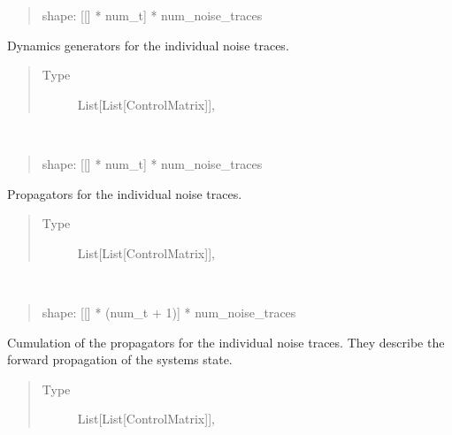 \documentclass[letterpaper,10pt,english]{sphinxmanual}
\begin{document}
\begin{fulllineitems}
\begin{fulllineitems}
\begin{quote}
shape: {[}{[}{]} * num\_t{]} * num\_noise\_traces
\end{quote}

Dynamics generators for the individual noise traces.
\begin{quote}\begin{description}
\item[{Type}] \leavevmode
List{[}List{[}ControlMatrix{]}{]},

\end{description}\end{quote}

\end{fulllineitems}


\begin{fulllineitems}
\label{\detokenize{qsim:qsim.solver_algorithms.SchroedingerSMonteCarlo._prop_noise}}~\begin{quote}

shape: {[}{[}{]} * num\_t{]} * num\_noise\_traces
\end{quote}

Propagators for the individual noise traces.
\begin{quote}\begin{description}
\item[{Type}] \leavevmode
List{[}List{[}ControlMatrix{]}{]},

\end{description}\end{quote}

\end{fulllineitems}


\begin{fulllineitems}
\label{\detokenize{qsim:qsim.solver_algorithms.SchroedingerSMonteCarlo._fwd_prop_noise}}~\begin{quote}

shape: {[}{[}{]} * (num\_t + 1){]} * num\_noise\_traces
\end{quote}

Cumulation of the propagators for the individual noise traces. They
describe the forward propagation of the systems state.
\begin{quote}\begin{description}
\item[{Type}] \leavevmode
List{[}List{[}ControlMatrix{]}{]},


\end{description}
\end{quote}
\end{fulllineitems}
\end{fulllineitems}
\end{document}
